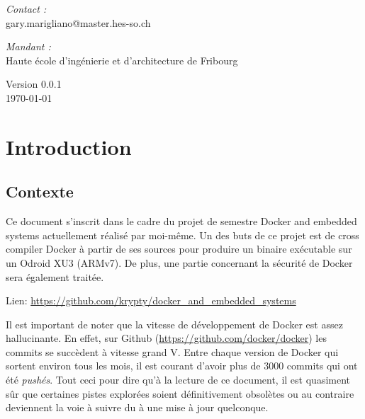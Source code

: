 \documentclass[11pt,a4paper,oneside]{report}
\begin{document}
\begin{titlepage}
\begin{center}
\vfill

\noindent
\begin{minipage}{0.4\textwidth}
  \begin{flushleft} \large
    \emph{Contact :}\\
    gary.marigliano@master.hes-so.ch
  \end{flushleft}
\end{minipage}%
\begin{minipage}{0.4\textwidth}
  \begin{flushright} \large
    \emph{Mandant :} \\
    Haute école d'ingénierie et d'architecture de Fribourg
  \end{flushright}
\end{minipage}

\vfill

{\large Version 0.0.1 \\ \today}

\end{center}
\end{titlepage}

\pagestyle{historystyle}
\begin{versionhistory}  
\end{versionhistory}


\tableofcontents
{}

\pagestyle{normal}

\chapter{Introduction}

\section{Contexte}\label{contexte}

Ce document s'inscrit dans le cadre du projet de semestre Docker and embedded systems actuellement réalisé par moi-même. Un des buts de ce projet est de cross compiler Docker à partir de ses sources pour produire un binaire exécutable sur un Odroid XU3 (ARMv7). De plus, une partie concernant la sécurité de Docker sera également traitée.

Lien: \url{https://github.com/krypty/docker_and_embedded_systems}

Il est important de noter que la vitesse de développement de Docker est assez hallucinante. En effet, sur Github (\url{https://github.com/docker/docker}) les commits se succèdent à vitesse grand V. Entre chaque version de Docker qui sortent environ tous les mois, il est courant d'avoir plus de 3000 commits qui ont été \emph{pushés}. Tout ceci pour dire qu'à la lecture de ce document, il est quasiment sûr que certaines pistes explorées soient définitivement obsolètes ou au contraire deviennent la voie à suivre du à une mise à jour quelconque.
\end{document}
